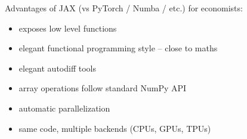 \begin{frame}

    Advantages of JAX (vs PyTorch / Numba / etc.) for economists:
    \begin{itemize}
        \item exposes low level functions
            \vspace{0.5em}
        \item elegant functional programming style -- close to maths
            \vspace{0.5em}
        \item elegant autodiff tools
            \vspace{0.5em}
        \item array operations follow standard NumPy API
            \vspace{0.5em}
        \item automatic parallelization
            \vspace{0.5em}
        \item same code, multiple backends (CPUs, GPUs, TPUs)
    \end{itemize}

\end{frame}


